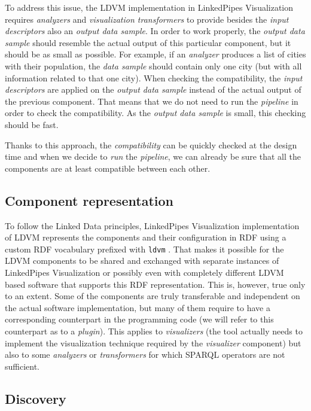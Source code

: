 To address this issue, the LDVM implementation in LinkedPipes Visualization requires \emph{analyzers} and \emph{visualization transformers} to provide besides the \emph{input descriptors} also an \emph{output data sample}. In order to work properly, the \emph{output data sample} should resemble the actual output of this particular component, but it should be as small as possible. For example, if an \emph{analyzer} produces a list of cities with their population, the \emph{data sample} should contain only one city (but with all information related to that one city). When checking the compatibility, the \emph{input descriptors} are applied on the \emph{output data sample} instead of the actual output of the previous component. That means that we do not need to run the \emph{pipeline} in order to check the compatibility. As the \emph{output data sample} is small, this checking should be fast.

Thanks to this approach, the \emph{compatibility} can be quickly checked at the design time and when we decide to \emph{run} the \emph{pipeline}, we can already be sure that all the components are at least compatible between each other.

\subsection{Component representation}

To follow the Linked Data principles, LinkedPipes Visualization implementation of LDVM represents the  components and their configuration in RDF using a custom RDF vocabulary prefixed with \texttt{ldvm} \cite{ldvm_vocabulary}. That makes it possible for the LDVM components to be shared and exchanged with separate instances of LinkedPipes Visualization or possibly even with completely different LDVM based software that supports this RDF representation. This is, however, true only to an extent. Some of the components are truly transferable and independent on the actual software implementation, but many of them require to have a corresponding counterpart in the programming code (we will refer to this counterpart as to a \emph{plugin}). This applies to \emph{visualizers} (the tool actually needs to implement the visualization technique required by the \emph{visualizer} component) but also to some \emph{analyzers} or \emph{transformers} for which SPARQL operators are not sufficient.

\subsection{Discovery}

